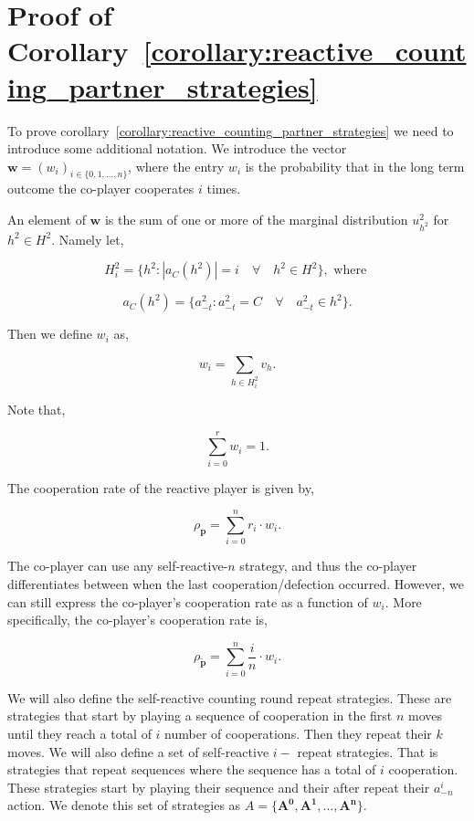 \documentclass{article}
\theoremstyle{definition}
\begin{document}

\section{Proof of Corollary~\ref{corollary:reactive_counting_partner_strategies}}\label{appendix:reactive_counting_n_akin_generalized}

To prove corollary~\ref{corollary:reactive_counting_partner_strategies} we need
to introduce some additional notation. We introduce the vector $\mathbf{w} =
(w_i)_{i \in \{0, 1, \dots, n\}}$, where the entry $w_i$ is the probability that
in the long term outcome the co-player cooperates $i$ times.

An element of $\mathbf{w}$ is the sum of one or more of the marginal distribution
$u^2_{h^2}$ for $h^2 \in H^2$. Namely let,

$$
H^2_{i} = \{h^2 : |a_{C}(h^2)| = i \quad \forall \quad h^2 \in H^2\}, \text{ where }
$$

$$
a_{C}(h^2) = \{a^2_{-t} : a^2_{-t} = C \quad \forall \quad a^2_{-t} \in h^2\}.
$$

Then we define $w_i$ as,

$$
w_{i} = {\sum_{h \in H^2_{i}} v_{h}}.
$$

Note that,

\begin{equation}\label{Eq:normalization_counting}
  \sum_{i=0}^{r} w_i = 1.
\end{equation}

The cooperation rate of the reactive player is given by,

\begin{equation}\label{Eq:player_cooperation_counting}
  \rho_{\mathbf{p}} = \sum_{i=0}^{n} r_{i} \cdot w_{i}.
\end{equation}

The co-player can use any self-reactive-$n$ strategy, and thus the co-player
differentiates between when the last cooperation/defection occurred. However,
we can still express the co-player's cooperation rate as a function of $w_{i}$.
More specifically, the co-player's cooperation rate is,

\begin{equation}\label{Eq:coplayer_cooperation_counting}
  \rho_{\mathbf{\tilde{p}}} = \sum_{i=0}^{n} \frac{i}{n} \cdot w_{i}.
\end{equation}

We will also define the self-reactive counting round repeat strategies. These
are strategies that start by playing a sequence of cooperation in the first $n$
moves until they reach a total of $i$ number of cooperations. Then they repeat
their $k$ moves.
We will also define a set of self-reactive $i-$ repeat strategies. That is
strategies that repeat sequences where the sequence has a total of $i$
cooperation. These strategies start by playing their sequence and their after
repeat their $a^{i}_{-n}$ action. We denote this set of strategies as $A =
\{\mathbf{A^{0}}, \mathbf{A^{1}}, \dots, \mathbf{A^{n}} \}$.
\end{document}
